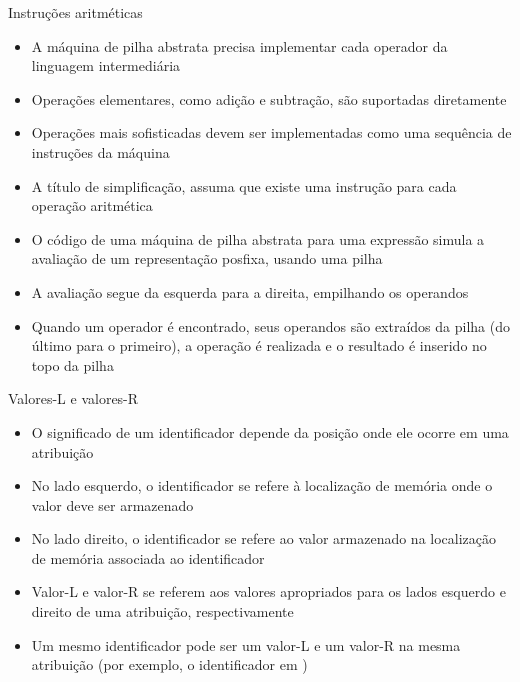 \begin{frame}[fragile]{Instruções aritméticas}

    \begin{itemize}
        \item  A máquina de pilha abstrata precisa implementar cada operador da linguagem intermediária
        \pause

        \item Operações elementares, como adição e subtração, são suportadas diretamente
        \pause

        \item Operações mais sofisticadas devem ser implementadas como uma sequência de instruções da máquina
        \pause

        \item A título de simplificação, assuma que existe uma instrução para cada operação aritmética
        \pause

        \item O código de uma máquina de pilha abstrata para uma expressão simula a avaliação de um representação posfixa, usando uma pilha
        \pause

        \item A avaliação segue da esquerda para a direita, empilhando os operandos
        \pause

        \item  Quando um operador é encontrado, seus operandos são extraídos da pilha
        (do último para o primeiro), a operação é realizada e o resultado é inserido no topo da pilha
    \end{itemize}

\end{frame}



\begin{frame}[fragile]{Valores-L e valores-R}

    \begin{itemize}
        \item O significado de um identificador depende da posição onde ele ocorre em uma atribuição
        \pause

        \item No lado esquerdo, o identificador se refere à localização de memória onde o valor deve ser armazenado
        \pause

        \item No lado direito, o identificador se refere ao valor armazenado na localização de memória associada ao identificador
        \pause

        \item Valor-L e valor-R se referem aos valores apropriados para os lados esquerdo e direito de uma atribuição, respectivamente
        \pause

        \item Um mesmo identificador pode ser um valor-L e um valor-R na mesma atribuição (por exemplo, o identificador  em )
    \end{itemize}

\end{frame}

